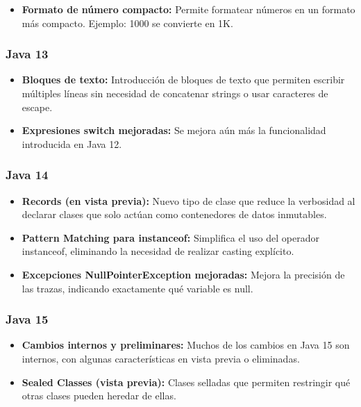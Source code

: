\begin{center}
\begin{itemize}
		\item \textbf{Formato de número compacto: }Permite formatear números en un formato más compacto.
		      Ejemplo: 1000 se convierte en 1K.

	\end{itemize}
	\subsubsection{Java 13}
	\begin{itemize}
		\item \textbf{Bloques de texto: }Introducción de bloques de texto que permiten escribir
		      múltiples líneas sin necesidad de concatenar strings o usar caracteres de escape.
		\item \textbf{Expresiones switch mejoradas: }Se mejora aún más la funcionalidad
		      introducida en Java 12.
	\end{itemize}

	\subsubsection{Java 14}
	\begin{itemize}
		\item \textbf{Records (en vista previa):} Nuevo tipo de clase que reduce la verbosidad al declarar
		      clases que solo actúan como contenedores de datos inmutables.

		\item \textbf{Pattern Matching para instanceof:} Simplifica el uso del operador instanceof,
		      eliminando la necesidad de realizar casting explícito.

		\item \textbf{Excepciones NullPointerException mejoradas:} Mejora la precisión de las trazas,
		      indicando exactamente qué variable es null.

	\end{itemize}
	\subsubsection{Java 15}
	\begin{itemize}
		\item \textbf{Cambios internos y preliminares:} Muchos de los cambios en Java 15 son internos,
		      con algunas características en vista previa o eliminadas.

		\item \textbf{Sealed Classes (vista previa):} Clases selladas que permiten restringir qué otras
		      clases pueden heredar de ellas.


\end{itemize}
\end{center}
